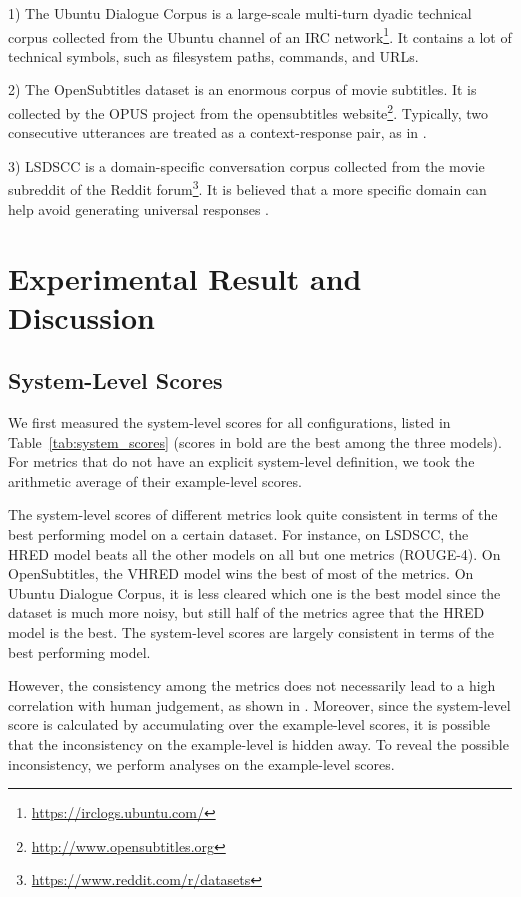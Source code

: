\documentclass[conference]{IEEEtran}
\begin{document}
1) The Ubuntu Dialogue Corpus \cite{ubuntu_corpus} is a large-scale multi-turn dyadic technical corpus collected from the Ubuntu channel of an IRC network\footnote{\url{https://irclogs.ubuntu.com/}}.
It contains a lot of technical symbols, such as filesystem paths, commands, and URLs.

2) The OpenSubtitles dataset \cite{opensub} is an enormous corpus of movie subtitles.
It is collected by the OPUS project \cite{OPUS} from the opensubtitles website\footnote{\url{http://www.opensubtitles.org}}.
Typically, two consecutive utterances are treated as a context-response pair, as in \cite{GoogleChatbot,MMI}.

3) LSDSCC \cite{LSDSCC} is a domain-specific conversation corpus collected from the movie subreddit of the Reddit forum\footnote{\url{https://www.reddit.com/r/datasets}}.
It is believed that a more specific domain can help avoid generating universal responses \cite{LSDSCC}.


\section{Experimental Result and Discussion}
\subsection{System-Level Scores}
We first measured the system-level scores for all configurations, listed in Table~\ref{tab:system_scores} (scores in bold are the best among the three models).
For metrics that do not have an explicit system-level definition, we took the arithmetic average of their example-level scores.


The system-level scores of different metrics look quite consistent in terms of the best performing model on a certain dataset.
For instance, on LSDSCC, the HRED model beats all the other models on all but one metrics (ROUGE-4).
On OpenSubtitles, the VHRED model wins the best of most of the metrics.
On Ubuntu Dialogue Corpus, it is less cleared which one is the best model since the dataset is much more noisy,
but still half of the metrics agree that the HRED model is the best.
The system-level scores are largely consistent in terms of the best performing model.

However, the consistency among the metrics does not necessarily lead to a high correlation with human judgement, as shown in \cite{HowNot}.
Moreover, since the system-level score is calculated by accumulating over the example-level scores,
it is possible that the inconsistency on the example-level is hidden away.
To reveal the possible inconsistency, we perform analyses on the example-level scores.
\end{document}
